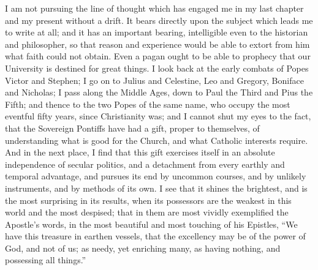 I am not pursuing the line of thought which has engaged me in my
last chapter and my present without a drift. It bears directly upon
the subject which leads me to write at all; and it has an important
bearing, intelligible even to the historian and philosopher, so that
reason and experience would be able to extort from him what faith
could not obtain. Even a pagan ought to be able to prophecy that our
University is destined for great things. I look back at the early
combats of Popes Victor and Stephen; I go on to Julius and Celestine,
Leo and Gregory, Boniface and Nicholas; I pass along the Middle Ages,
down to Paul the Third and Pius the Fifth; and thence to the two Popes
of the same name, who occupy the most eventful fifty years, since
Christianity was; and I cannot shut my eyes to the fact, that the
Sovereign Pontiffs have had a gift, proper to themselves, of
understanding what is good for the Church, and what Catholic interests
require. And in the next place, I find that this gift exercises itself
in an absolute independence of secular politics, and a detachment from
every earthly and temporal advantage, and pursues its end by uncommon
courses, and by unlikely instruments, and by methods of its own. I see
that it shines the brightest, and is the most surprising in its
results, when its possessors are the weakest in this world and the
most despised; that in them are most vividly exemplified the Apostle's
words, in the most beautiful and most touching of his Epistles,
``We have this treasure in earthen vessels, that the excellency
may be of the power of God, and not of us; as needy, yet enriching
many, as having nothing, and possessing all things.''

